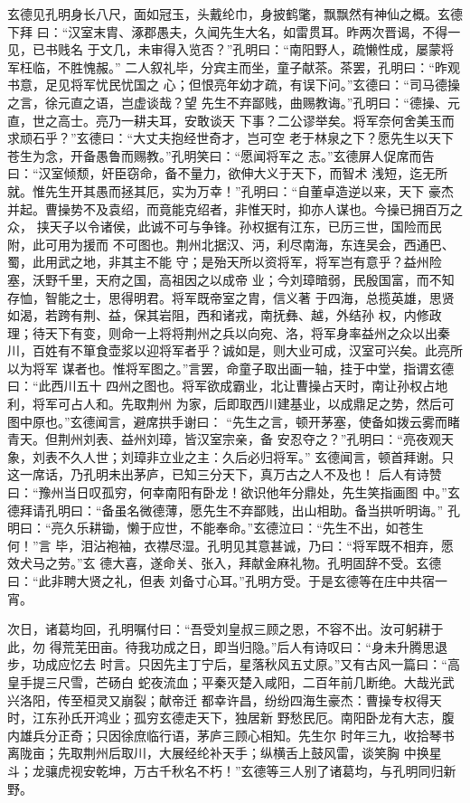 玄德见孔明身长八尺，面如冠玉，头戴纶巾，身披鹤氅，飘飘然有神仙之概。玄德下拜
曰：“汉室末胄、涿郡愚夫，久闻先生大名，如雷贯耳。昨两次晋谒，不得一见，已书贱名
于文几，未审得入览否？”孔明曰：“南阳野人，疏懒性成，屡蒙将军枉临，不胜愧赧。”
二人叙礼毕，分宾主而坐，童子献茶。茶罢，孔明曰：“昨观书意，足见将军忧民忧国之
心；但恨亮年幼才疏，有误下问。”玄德曰：“司马德操之言，徐元直之语，岂虚谈哉？望
先生不弃鄙贱，曲赐教诲。”孔明曰：“德操、元直，世之高士。亮乃一耕夫耳，安敢谈天
下事？二公谬举矣。将军奈何舍美玉而求顽石乎？”玄德曰：“大丈夫抱经世奇才，岂可空
老于林泉之下？愿先生以天下苍生为念，开备愚鲁而赐教。”孔明笑曰：“愿闻将军之
志。”玄德屏人促席而告曰：“汉室倾颓，奸臣窃命，备不量力，欲伸大义于天下，而智术
浅短，迄无所就。惟先生开其愚而拯其厄，实为万幸！”孔明曰：“自董卓造逆以来，天下
豪杰并起。曹操势不及袁绍，而竟能克绍者，非惟天时，抑亦人谋也。今操已拥百万之众，
挟天子以令诸侯，此诚不可与争锋。孙权据有江东，已历三世，国险而民附，此可用为援而
不可图也。荆州北据汉、沔，利尽南海，东连吴会，西通巴、蜀，此用武之地，非其主不能
守；是殆天所以资将军，将军岂有意乎？益州险塞，沃野千里，天府之国，高祖因之以成帝
业；今刘璋暗弱，民殷国富，而不知存恤，智能之士，思得明君。将军既帝室之胄，信义著
于四海，总揽英雄，思贤如渴，若跨有荆、益，保其岩阻，西和诸戎，南抚彝、越，外结孙
权，内修政理；待天下有变，则命一上将将荆州之兵以向宛、洛，将军身率益州之众以出秦
川，百姓有不箪食壶浆以迎将军者乎？诚如是，则大业可成，汉室可兴矣。此亮所以为将军
谋者也。惟将军图之。”言罢，命童子取出画一轴，挂于中堂，指谓玄德曰：“此西川五十
四州之图也。将军欲成霸业，北让曹操占天时，南让孙权占地利，将军可占人和。先取荆州
为家，后即取西川建基业，以成鼎足之势，然后可图中原也。”玄德闻言，避席拱手谢曰：
“先生之言，顿开茅塞，使备如拨云雾而睹青天。但荆州刘表、益州刘璋，皆汉室宗亲，备
安忍夺之？”孔明曰：“亮夜观天象，刘表不久人世；刘璋非立业之主：久后必归将军。”
玄德闻言，顿首拜谢。只这一席话，乃孔明未出茅庐，已知三分天下，真万古之人不及也！
后人有诗赞曰：“豫州当日叹孤穷，何幸南阳有卧龙！欲识他年分鼎处，先生笑指画图
中。”玄德拜请孔明曰：“备虽名微德薄，愿先生不弃鄙贱，出山相助。备当拱听明诲。”
孔明曰：“亮久乐耕锄，懒于应世，不能奉命。”玄德泣曰：“先生不出，如苍生何！”言
毕，泪沾袍袖，衣襟尽湿。孔明见其意甚诚，乃曰：“将军既不相弃，愿效犬马之劳。”玄
德大喜，遂命关、张入，拜献金麻礼物。孔明固辞不受。玄德曰：“此非聘大贤之礼，但表
刘备寸心耳。”孔明方受。于是玄德等在庄中共宿一宵。

次日，诸葛均回，孔明嘱付曰：“吾受刘皇叔三顾之恩，不容不出。汝可躬耕于此，勿
得荒芜田亩。待我功成之日，即当归隐。”后人有诗叹曰：“身未升腾思退步，功成应忆去
时言。只因先主丁宁后，星落秋风五丈原。”又有古风一篇曰：“高皇手提三尺雪，芒砀白
蛇夜流血；平秦灭楚入咸阳，二百年前几断绝。大哉光武兴洛阳，传至桓灵又崩裂；献帝迁
都幸许昌，纷纷四海生豪杰：曹操专权得天时，江东孙氏开鸿业；孤穷玄德走天下，独居新
野愁民厄。南阳卧龙有大志，腹内雄兵分正奇；只因徐庶临行语，茅庐三顾心相知。先生尔
时年三九，收拾琴书离陇亩；先取荆州后取川，大展经纶补天手；纵横舌上鼓风雷，谈笑胸
中换星斗；龙骧虎视安乾坤，万古千秋名不朽！”玄德等三人别了诸葛均，与孔明同归新
野。

